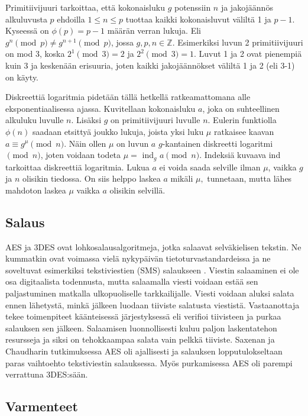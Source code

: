 \documentclass[finnish]{tktltiki2}
\theoremstyle{definition}
\theoremstyle{remark}
\begin{document}
Primitiivijuuri tarkoittaa, että kokonaisluku $g$ potenssiin $n$ ja jakojäännös alkuluvusta $p$ ehdoilla $1 \leq n \leq p$ tuottaa kaikki kokonaisluvut väliltä 1 ja $p-1$. Kyseessä on $\phi(p) = p - 1$ määrän verran lukuja. Eli $g^n \pmod{p} \neq g^{n+1} \pmod{p}$, jossa $g, p, n \in \mathbb{Z}$. Esimerkiksi luvun 2 primitiivijuuri on mod 3, koska $2^1 \pmod{3} = 2$ ja $2^2 \pmod{3} = 1$. Luvut 1 ja 2 ovat pienempiä kuin 3 ja keskenään erisuuria, joten kaikki jakojäännökset väliltä 1 ja 2 (eli 3-1) on käyty. \cite{prim}

Diskreettiä logaritmia pidetään tällä hetkellä ratkeamattomana alle eksponentiaalisessa ajassa. Kuvitellaan kokonaisluku $a$, joka on suhteellinen alkuluku luvulle $n$. Lisäksi $g$ on primitiivijuuri luvulle $n$. Eulerin funktiolla $\phi(n)$ saadaan etsittyä joukko lukuja, joista yksi luku $\mu$ ratkaisee kaavan  $a \equiv g^{\mu} \pmod{n}$. Näin ollen $\mu$ on luvun $a$ $g$-kantainen diskreetti logaritmi $\pmod{n}$, joten voidaan todeta $\mu = $ ind$_g$ $a\pmod{n}$. Indeksiä kuvaava ind tarkoittaa diskreettiä logaritmia. Lukua $a$ ei voida saada selville ilman $\mu$, vaikka $g$ ja $n$ olisikin tiedossa. On siis helppo laskea $a$ mikäli $\mu, $ tunnetaan, mutta lähes mahdoton laskea $\mu$ vaikka $a$ olisikin selvillä. \cite{disc}

\subsection{Salaus} 

AES ja 3DES ovat lohkosalausalgoritmeja, jotka salaavat selväkielisen tekstin. Ne kummatkin ovat voimassa vielä nykypäivän tietoturvastandardeissa ja ne soveltuvat esimerkiksi tekstiviestien (SMS) salaukseen \cite{gsm}. Viestin salaaminen ei ole osa digitaalista todennusta, mutta salaamalla viesti voidaan estää sen paljastuminen matkalla ulkopuoliselle tarkkailijalle. Viesti voidaan aluksi salata ennen lähetystä, minkä jälkeen luodaan tiiviste salatusta viestistä. Vastaanottaja tekee toimenpiteet käänteisessä järjestyksessä eli verifioi tiivisteen ja purkaa salauksen sen jälkeen. Salaamisen luonnollisesti kuluu paljon laskentatehon resursseja ja siksi on tehokkaampaa salata vain pelkkä tiiviste. Saxenan ja Chaudharin \cite{gsm} tutkimuksessa AES oli ajallisesti ja salauksen lopputulokseltaan paras vaihtoehto tekstiviestin salauksessa. Myös purkamisessa AES oli parempi verrattuna 3DES:sään. 

\subsection{Varmenteet}
\end{document}
